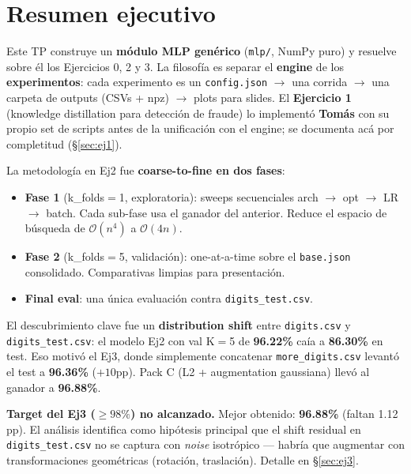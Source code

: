 \documentclass[11pt,a4paper]{article}
\newcommand{\code}[1]{\texttt{\textcolor{accent}{#1}}}
\begin{document}
\section*{Resumen ejecutivo}

Este TP construye un \textbf{módulo MLP genérico} (\code{mlp/}, NumPy puro) y resuelve sobre él los Ejercicios 0, 2 y 3. La filosofía es separar el \textbf{engine} de los \textbf{experimentos}: cada experimento es un \code{config.json} \(\rightarrow\) una corrida \(\rightarrow\) una carpeta de outputs (CSVs + npz) \(\rightarrow\) plots para slides. El \textbf{Ejercicio 1} (knowledge distillation para detección de fraude) lo implementó \textbf{Tomás} con su propio set de scripts antes de la unificación con el engine; se documenta acá por completitud (§\ref{sec:ej1}).

\medskip
La metodología en Ej2 fue \textbf{coarse-to-fine en dos fases}:
\begin{itemize}[leftmargin=1.4em, itemsep=2pt]
  \item \textbf{Fase 1} (k\_folds$=$1, exploratoria): sweeps secuenciales arch \(\to\) opt \(\to\) LR \(\to\) batch. Cada sub-fase usa el ganador del anterior. Reduce el espacio de búsqueda de $\mathcal{O}(n^4)$ a $\mathcal{O}(4n)$.
  \item \textbf{Fase 2} (k\_folds$=$5, validación): one-at-a-time sobre el \code{base.json} consolidado. Comparativas limpias para presentación.
  \item \textbf{Final eval}: una única evaluación contra \code{digits\_test.csv}.
\end{itemize}

El descubrimiento clave fue un \textbf{distribution shift} entre \code{digits.csv} y \code{digits\_test.csv}: el modelo Ej2 con val K$=$5 de \textbf{96.22\%} caía a \textbf{86.30\%} en test. Eso motivó el Ej3, donde simplemente concatenar \code{more\_digits.csv} levantó el test a \textbf{96.36\%} (\(+10\)pp). Pack C (L2 + augmentation gaussiana) llevó al ganador a \textbf{96.88\%}.

\begin{caveat}
\textbf{Target del Ej3 (\(\geq 98\%\)) no alcanzado.} Mejor obtenido: \textbf{96.88\%} (faltan 1.12\,pp). El análisis identifica como hipótesis principal que el shift residual en \code{digits\_test.csv} no se captura con \emph{noise} isotrópico — habría que augmentar con transformaciones geométricas (rotación, traslación). Detalle en §\ref{sec:ej3}.
\end{caveat}
\end{document}
